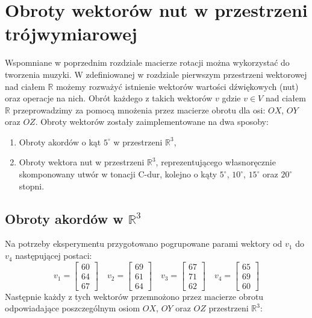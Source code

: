 \chapter{Obroty wektorów nut w przestrzeni trójwymiarowej}

Wspomniane w poprzednim rozdziale macierze rotacji można wykorzystać do tworzenia muzyki.
W zdefiniowanej w rozdziale pierwszym przestrzeni wektorowej nad ciałem $\mathbb{R}$ możemy rozważyć istnienie  wektorów wartości dźwiękowych (nut) oraz operacje na nich.
Obrót każdego z takich wektorów $v$ gdzie $v \in V$ nad ciałem $\mathbb{R}$ przeprowadzimy za pomocą mnożenia przez macierze obrotu dla osi: $OX$, $OY$ oraz $OZ$. Obroty wektorów zostały zaimplementowane na dwa sposoby:
\begin{enumerate}
    \item Obroty akordów o kąt $5^{\circ}$ w przestrzeni $\mathbb{R}^{3}$,
    \item Obroty wektora nut w przestrzeni $\mathbb{R}^{3}$, reprezentującego własnoręcznie skomponowany utwór w tonacji C-dur, kolejno o kąty $5^{\circ}$, $10^{\circ}$, $15^{\circ}$ oraz $20^{\circ}$ stopni.
\end{enumerate}

\section{Obroty akordów w \texorpdfstring{$\mathbb{R}^{3}$}{R3}}
Na potrzeby eksperymentu przygotowano pogrupowane parami wektory od $v_{1}$ do $v_{4}$ następującej postaci:
\begin{equation*}
v_{1} =
    \begin{bmatrix}
     60 \\
     64 \\
     67
    \end{bmatrix}
    \quad
    v_{2} =
    \begin{bmatrix}
     69 \\
     61 \\
     64
    \end{bmatrix}
    \quad
    v_{3} =
    \begin{bmatrix}
     67 \\
     71 \\
     62
    \end{bmatrix}
    \quad
    v_{4} =
    \begin{bmatrix}
     65 \\
     69 \\
     60
    \end{bmatrix}
\end{equation*}
Następnie każdy z tych wektorów przemnożono przez macierze obrotu odpowiadające poszczególnym osiom $OX$, $OY$ oraz $OZ$ przestrzeni $\mathbb{R}^{3}$:

